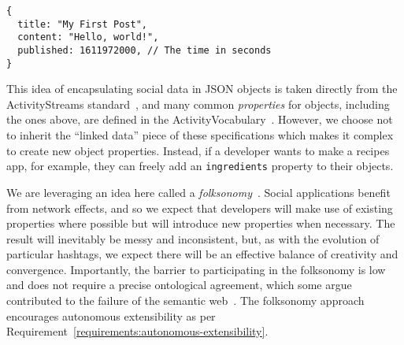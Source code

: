 \begin{verbatim}
{
  title: "My First Post",
  content: "Hello, world!",
  published: 1611972000, // The time in seconds
}
\end{verbatim}

This idea of encapsulating social data in JSON objects is
taken directly from the ActivityStreams standard~\cite{activitystreams},
and many common \emph{properties} for objects,
including the ones above, are defined in the
ActivityVocabulary~\cite{activityvocab}.
However, we choose not to inherit the ``linked data'' piece
of these specifications which makes it complex to create new object properties.
Instead, if a developer wants to make a recipes app, for example,
they can freely add an \texttt{ingredients} property to their objects.

We are leveraging an idea here called a \emph{folksonomy}~\cite{folksonomy}.
Social applications
benefit from network effects, and so we expect that developers will make use of
existing properties where possible
but will introduce new properties when necessary.
The result will inevitably be messy and inconsistent, but, as with the evolution of
particular hashtags, we expect there will be an effective balance of creativity and convergence.
Importantly, the barrier to participating in the folksonomy is low
and does not require a precise ontological agreement,
which some argue contributed to the failure of the semantic
web~\cite{semanticwebtwodecades}.
The folksonomy approach encourages autonomous extensibility
as per Requirement~\ref{requirements:autonomous-extensibility}.


